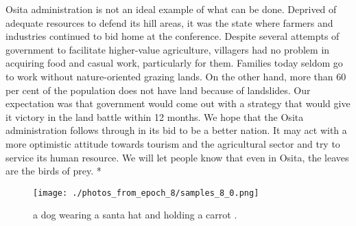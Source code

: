 \documentclass{article}%
\begin{document}
Osita administration is not an ideal example of what can be done. Deprived of adequate resources to defend its hill areas, it was the state where farmers and industries continued to bid home at the conference. Despite several attempts of government to facilitate higher{-}value agriculture, villagers had no problem in acquiring food and casual work, particularly for them. Families today seldom go to work without nature{-}oriented grazing lands. On the other hand, more than 60 per cent of the population does not have land because of landslides.\newline%
Our expectation was that government would come out with a strategy that would give it victory in the land battle within 12 months. We hope that the Osita administration follows through in its bid to be a better nation. It may act with a more optimistic attitude towards tourism and the agricultural sector and try to service its human resource.\newline%
We will let people know that even in Osita, the leaves are the birds of prey.\newline%
*\newline%

%


\begin{figure}[h!]%
\centering%
\texttt{[image: ./photos\_from\_epoch\_8/samples\_8\_0.png]}%
\caption{a dog wearing a santa hat and holding a carrot .}%
\end{figure}

%
\end{document}
